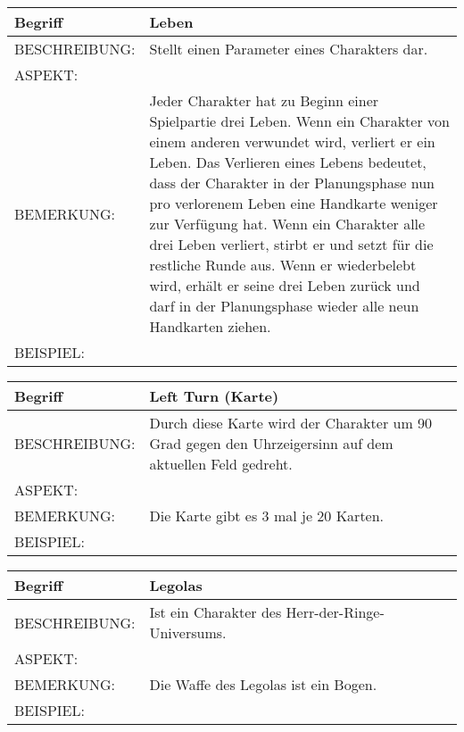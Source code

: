 \documentclass{uulm-assignment}
\begin{document}
	     \begin{tabularx}{\textwidth}{|l|X |} \hline
	        \textbf{Begriff} & \textbf{Leben} \\
	        \hline
	        BESCHREIBUNG: & Stellt einen Parameter eines Charakters dar. \\
	        \hline
	        ASPEKT: &
	        \\
	        \hline
	        BEMERKUNG: & Jeder Charakter hat zu Beginn einer Spielpartie drei Leben. Wenn ein Charakter von einem anderen verwundet wird, verliert er ein Leben. Das Verlieren eines Lebens bedeutet, dass der Charakter in der Planungsphase nun pro verlorenem Leben eine Handkarte weniger zur Verfügung hat. Wenn ein Charakter alle drei Leben verliert, stirbt er und setzt für die restliche Runde aus. Wenn er wiederbelebt wird, erhält er seine drei Leben zurück und darf in der Planungsphase wieder alle neun Handkarten ziehen.\\
	        \hline
	        BEISPIEL: & \\
	        \hline
	    \end{tabularx}

	     \begin{tabularx}{\textwidth}{|l|X |} \hline
	        \textbf{Begriff} & \textbf{Left Turn (Karte)} \\
	        \hline
	        BESCHREIBUNG: & Durch diese Karte wird der Charakter um 90 Grad gegen den Uhrzeigersinn auf dem aktuellen Feld gedreht. \\
	        \hline
	        ASPEKT: &
	        \\
	        \hline
	        BEMERKUNG: & Die Karte gibt es 3 mal je 20 Karten.\\
	        \hline
	        BEISPIEL: & \\
	        \hline
	    \end{tabularx}

	     \begin{tabularx}{\textwidth}{|l|X |} \hline
	        \textbf{Begriff} & \textbf{Legolas} \\
	        \hline
	        BESCHREIBUNG: & Ist ein Charakter des Herr-der-Ringe-Universums. \\
	        \hline
	        ASPEKT: &
	        \\
	        \hline
	        BEMERKUNG: & Die Waffe des Legolas ist ein Bogen.\\
	        \hline
	        BEISPIEL: & \\
	        \hline
	    \end{tabularx}
\end{document}
